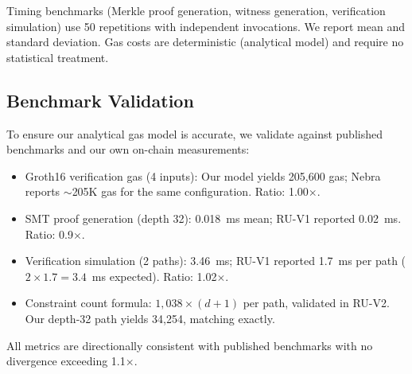 Timing benchmarks (Merkle proof generation, witness generation, verification
simulation) use 50 repetitions with independent invocations. We report mean
and standard deviation. Gas costs are deterministic (analytical model) and
require no statistical treatment.

\subsection{Benchmark Validation}

To ensure our analytical gas model is accurate, we validate against published
benchmarks and our own on-chain measurements:

\begin{itemize}
\item Groth16 verification gas (4 inputs): Our model yields 205,600 gas;
  Nebra~\cite{nebra2024upa} reports $\sim$205K gas for the same configuration.
  Ratio: 1.00$\times$.
\item SMT proof generation (depth 32): 0.018~ms mean; RU-V1 reported 0.02~ms.
  Ratio: 0.9$\times$.
\item Verification simulation (2 paths): 3.46~ms; RU-V1 reported 1.7~ms per
  path ($2 \times 1.7 = 3.4$~ms expected). Ratio: 1.02$\times$.
\item Constraint count formula: $1{,}038 \times (d+1)$ per path, validated
  in RU-V2. Our depth-32 path yields 34,254, matching exactly.
\end{itemize}

All metrics are directionally consistent with published benchmarks with no
divergence exceeding 1.1$\times$.
